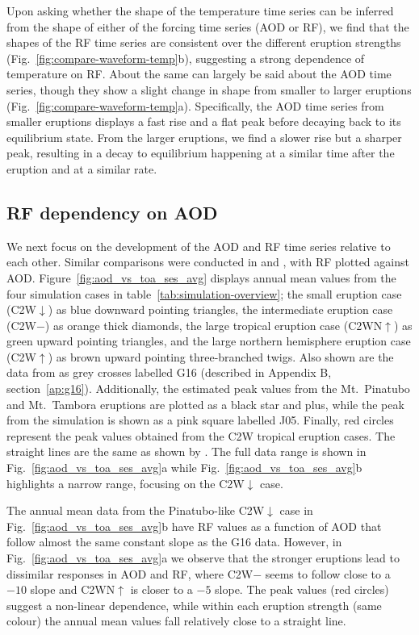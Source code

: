 \documentclass[draft]{agujournal2019}
\newcommand{\cwmp}{C2W\(-\)}
\newcommand{\cwm}{C2W\(\downarrow\)}
\newcommand{\cws}{C2WN\(\uparrow\)}
\newcommand{\cwsn}{C2W\(\uparrow\)}
\begin{document}
Upon asking whether the shape of the temperature time series can be inferred from the
shape of either of the forcing time series (AOD or RF), we find that the
shapes of the RF time series are consistent over the different eruption strengths
(Fig.~\ref{fig:compare-waveform-temp}b), suggesting a strong dependence of temperature
on RF. About the same can largely be said about the AOD time series, though
they show a slight change in shape from smaller to larger eruptions
(Fig.~\ref{fig:compare-waveform-temp}a). Specifically, the AOD time series from
smaller eruptions displays a fast rise and a flat peak before decaying back to its
equilibrium state. From the larger eruptions, we find a slower rise but a sharper peak,
resulting in a decay to equilibrium happening at a similar time after the eruption and
at a similar rate.

\subsection{RF dependency on AOD}

We next focus on the development of the AOD and RF time series relative to
each other. Similar comparisons were conducted in 
and , with RF plotted against AOD.
Figure~\ref{fig:aod_vs_toa_ses_avg} displays annual mean values from the four simulation
cases in table~\ref{tab:simulation-overview}; the small eruption case (\cwm{}) as
blue downward pointing triangles, the intermediate eruption case (\cwmp{}) as orange
thick diamonds, the large tropical eruption case (\cws{}) as green upward pointing
triangles, and the large northern hemisphere eruption case (\cwsn{}) as brown upward
pointing three-branched twigs. Also shown are the data from  as grey crosses labelled G16
(described in Appendix B, section~\ref{ap:g16}). Additionally, the estimated peak values
from the Mt.\ Pinatubo and Mt.\ Tambora eruptions are plotted as a black star and plus,
while the peak from the  simulation is shown as a pink square labelled
J05. Finally, red circles represent the peak values obtained from the C2W
tropical eruption cases. The straight lines are the same as shown by
. The full data range is shown in Fig.~\ref{fig:aod_vs_toa_ses_avg}a
while Fig.~\ref{fig:aod_vs_toa_ses_avg}b highlights a narrow range, focusing on the
\cwm{} case.

The annual mean data from the Pinatubo-like \cwm{} case in
Fig.~\ref{fig:aod_vs_toa_ses_avg}b have RF values as a function of AOD that
follow almost the same constant slope as the G16 data. However, in
Fig.~\ref{fig:aod_vs_toa_ses_avg}a we observe that the stronger eruptions lead to
dissimilar responses in AOD and RF, where \cwmp{}
seems to follow close to a \(-10\) slope and \cws{} is closer to a
\(-5\) slope. The peak values (red circles) suggest a non-linear dependence, while
within each eruption strength (same colour) the annual mean values fall relatively close
to a straight line.
\end{document}
